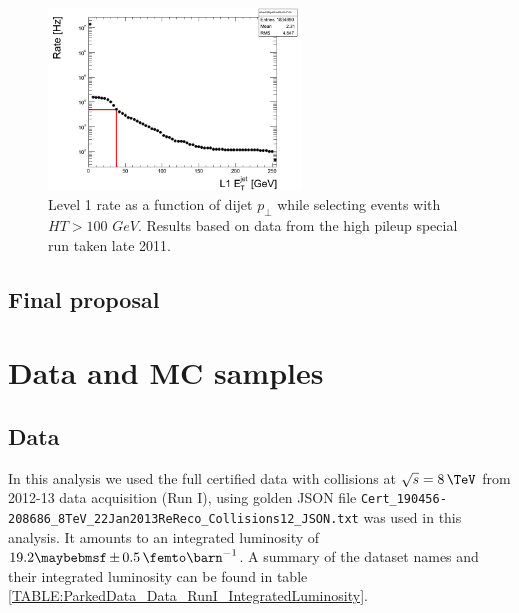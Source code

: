\begin{figure}[ht]
\centering
\includegraphics[width=0.60\textwidth]{Chapter06/ParkedDataTriggerDevelopment/Images/PU28_5e33_RateFBDijetDEtaDPhi00HT100.png}
\caption{Level 1 rate as a function of dijet $p_\bot$ while selecting events with $HT>100$ $GeV$. Results based on
data from the high pileup special run taken late 2011.}
\label{figure_PU28_5e33_RateFBDijetDEtaDPhi00HT100}
\end{figure}

\subsection{Final proposal}



\section{Data and MC samples}

\subsection{Data}

In this analysis we used the full certified data with collisions at $\sqrt{s}=8\,\TeV$ from 2012-13 data acquisition (Run I), using golden JSON file \verb|Cert_190456-208686_8TeV_22Jan2013ReReco_Collisions12_JSON.txt| was used in this analysis. It amounts to an integrated luminosity of $19.2 \pm 0.5 \,\femto\barn^{-1}$. A summary of the dataset names and their integrated luminosity can be found in table \ref{TABLE:ParkedData_Data_RunI_IntegratedLuminosity}.

